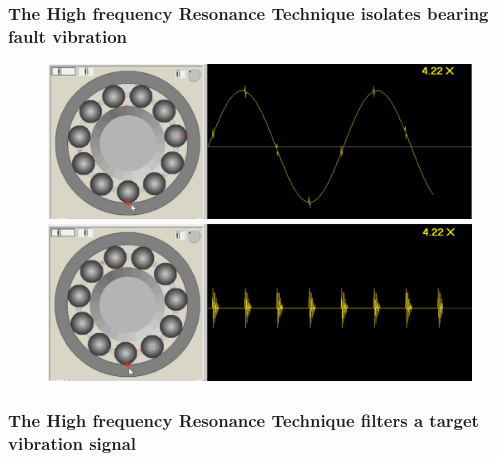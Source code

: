 \documentclass{beamer}
\begin{document}



\begin{frame}
	\frametitle{The High frequency Resonance Technique isolates bearing fault vibration}
	\begin{figure}[H]
		\centering
		\includegraphics[width=0.8\linewidth]{outer-race1}
		\includegraphics[width=0.8\linewidth]{outer-race2}
	\end{figure}
\end{frame}


\begin{frame}
	\frametitle{The High frequency Resonance Technique filters a target vibration signal}
	\begin{figure}[H]
		\centering
	\end{figure}
\end{frame}

\end{document}
